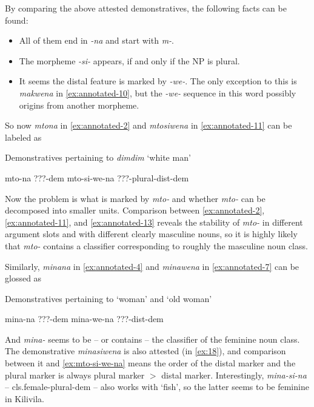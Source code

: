\documentclass{article}
\newcommand*{\corpus}[1]{\emph{#1}}
\newcommand{\translate}[1]{`#1'}
\def\\{}%
\begin{document}
By comparing the above attested demonstratives,
the following facts can be found:
\begin{itemize}
    \item All of them end in \corpus{-na} and start with \corpus{m-}.
    \item The morpheme \corpus{-si-} appears, if and only if the NP is plural.
    \item It seems the distal feature is marked by \corpus{-we-}.
    The only exception to this is \corpus{makwena} in \eqref{ex:annotated-10},
    but the \corpus{-we-} sequence in this word possibly origins from another morpheme.
\end{itemize}
So now \corpus{mtona} in \eqref{ex:annotated-2} 
and \corpus{mtosiwena} in \eqref{ex:annotated-11} can be labeled as 
\begin{exe}
    \ex\label{ex:masculine-try}Demonstratives pertaining to \corpus{dimdim} \translate{white man}
    \begin{xlist}
        \ex \gll mto-na \\
        ???-\acs{dem} \\
        \ex\label{ex:mto-si-we-na} \gll mto-si-we-na \\ 
        ???-\acs{plural}-\acs{dist}-\acs{dem} \\
    \end{xlist}
\end{exe}
Now the problem is what is marked by \corpus{mto-} and
whether \corpus{mto-} can be decomposed into smaller units.
Comparison between \eqref{ex:annotated-2}, \eqref{ex:annotated-11}, and \eqref{ex:annotated-13}
reveals the stability of \corpus{mto-} in different argument slots 
and with different clearly masculine nouns,
so it is highly likely that \corpus{mto-} contains a classifier 
corresponding to roughly the masculine noun class.

Similarly, \corpus{minana} in \eqref{ex:annotated-4} and \corpus{minawena} in \eqref{ex:annotated-7} 
can be glossed as 
\begin{exe}
    \ex\label{ex:feminine-try} Demonstratives pertaining to \translate{woman} and \translate{old woman} 
    \begin{xlist}
        \ex \gll mina-na  \\
        ???-\acs{dem} \\
        \ex \gll mina-we-na \\
        ???-\acs{dist}-\acs{dem} \\
    \end{xlist}
\end{exe}
And \corpus{mina-} seems to be -- or contains -- the classifier of the feminine noun class.
The demonstrative \corpus{minasiwena} is also attested (in \eqref{ex:18}),
and comparison between it and \eqref{ex:mto-si-we-na} 
means the order of the distal marker and the plural marker is always 
plural marker $>$ distal marker.
Interestingly, \corpus{mina-si-na} -- \acs{cls}.female-\acs{plural}-\acs{dem} -- 
also works with \translate{fish}, 
so the latter seems to be feminine in Kilivila.
\end{document}
